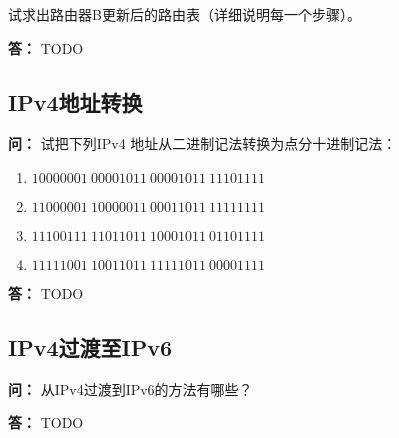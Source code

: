 \documentclass[12pt,hyperref,a4paper,UTF8]{ctexart}
\begin{document}
试求出路由器B更新后的路由表（详细说明每一个步骤）。

\textbf{答：}
TODO

\subsection{IPv4地址转换}
\textbf{问：}
试把下列IPv4 地址从二进制记法转换为点分十进制记法：
\begin{enumerate}[label=\Roman*)]
    \item $10000001 \ 00001011 \ 00001011 \ 11101111$
    \item $11000001 \ 10000011 \ 00011011 \ 11111111$
    \item $11100111 \ 11011011 \ 10001011 \ 01101111$
    \item $11111001 \ 10011011 \ 11111011 \ 00001111$
\end{enumerate}

\textbf{答：}
TODO

\subsection{IPv4过渡至IPv6}
\textbf{问：}
从IPv4过渡到IPv6的方法有哪些？

\textbf{答：}
TODO
\end{document}
